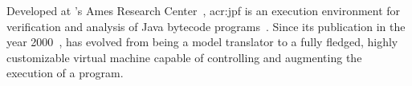 






Developed at 's Ames Research Center~\cite{WebNASAAmes2017}, \acrfull{acr:jpf} is an execution environment for verification and analysis of Java bytecode programs~\cite{Visser2003,WebJPF2017}. Since its publication in the year 2000~\cite{Havelund2000}, \jpf has evolved from being a model translator to a fully fledged, highly customizable virtual machine capable of controlling and augmenting the execution of a program.

